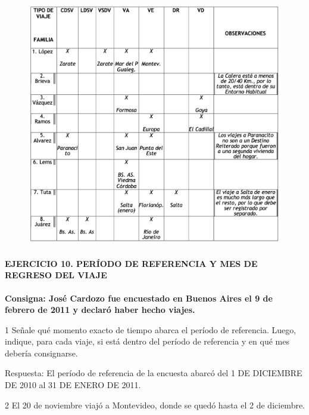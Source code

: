 \documentclass[
  openany]{book}
\begin{document}
\begin{figure}

{\centering \includegraphics[width=1\linewidth]{imagenes/figura6-150} 

}

\end{figure}

\hypertarget{ejercicio-10.-peruxedodo-de-referencia-y-mes-de-regreso-del-viaje-1}{%
\paragraph{\texorpdfstring{\textbf{EJERCICIO 10. PERÍODO DE REFERENCIA Y MES DE REGRESO DEL VIAJE}}{EJERCICIO 10. PERÍODO DE REFERENCIA Y MES DE REGRESO DEL VIAJE}}\label{ejercicio-10.-peruxedodo-de-referencia-y-mes-de-regreso-del-viaje-1}}

\textbf{Consigna: José Cardozo fue encuestado en Buenos Aires el 9 de febrero de 2011 y declaró haber hecho viajes.}

1 Señale qué momento exacto de tiempo abarca el período de referencia. Luego, indique, para cada viaje, si está dentro del período de referencia y en qué mes debería consignarse.

Respuesta: El período de referencia de la encuesta abarcó del 1 DE DICIEMBRE DE 2010 al 31 DE ENERO DE 2011.

2 El 20 de noviembre viajó a Montevideo, donde se quedó hasta el 2 de diciembre.
\end{document}
